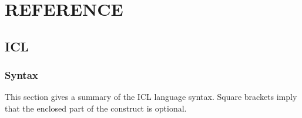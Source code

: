 \part{REFERENCE}
\label{P_refsect}

\chapter{ICL}
\label{C_rsicl}
\pagestyle{myheadings}

\small

\section{Syntax}

This section gives a summary of the ICL language syntax.
Square brackets imply that the enclosed part of the construct is optional.

